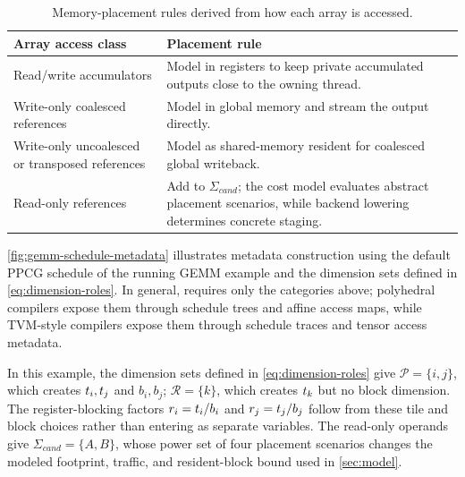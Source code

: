 \begin{table}[tbp]
  \caption{Memory-placement rules derived from how each array is accessed.}
  \label{tab:placement-rules}
  \centering
  \scriptsize
  \setlength{\tabcolsep}{6pt}
  \renewcommand{\arraystretch}{1.10}
  \begin{tabularx}{\textwidth}{@{}
    >{\raggedright\arraybackslash}p{}
    >{\raggedright\arraybackslash}X
    @{}}
    \toprule
    \textbf{Array access class} & \textbf{Placement rule} \\
    \midrule
    Read/write accumulators &
      Model in registers to keep private accumulated outputs close to the
      owning thread. \\
    Write-only coalesced references &
      Model in global memory and stream the output directly. \\
    Write-only uncoalesced or transposed references &
      Model as shared-memory resident for coalesced global writeback. \\
    Read-only references &
      Add to \(\Sigma_{\mathit{cand}}\); the cost model evaluates abstract
      placement scenarios, while backend lowering determines concrete staging. \\
    \bottomrule
  \end{tabularx}
\end{table}

\autoref{fig:gemm-schedule-metadata} illustrates metadata construction using the default PPCG schedule of the running GEMM example and the dimension sets defined in \autoref{eq:dimension-roles}. In general, \name requires only the categories above; polyhedral compilers expose them through schedule trees and affine access maps, while TVM-style compilers expose them through schedule traces and tensor access metadata.




In this example, the dimension sets defined in \autoref{eq:dimension-roles} give \(\mathcal{P}=\{i,j\}\), which creates \(t_i,t_j\) and \(b_i,b_j\); \(\mathcal{R}=\{k\}\), which creates \(t_k\) but no block dimension. The register-blocking factors \(r_i=t_i/b_i\) and \(r_j=t_j/b_j\) follow from these tile and block choices rather than entering as separate variables. The read-only operands give \(\Sigma_{\mathit{cand}}=\{A,B\}\), whose power set of four placement scenarios changes the modeled footprint, traffic, and resident-block bound used in \autoref{sec:model}.


